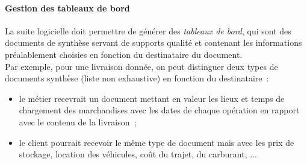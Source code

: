 \paragraph{Gestion des tableaux de bord}
La suite logicielle doit permettre de générer des \emph{tableaux de bord}, qui sont des documents de synthèse servant de supports qualité et contenant les informations préalablement choisies en fonction du destinataire du document.
\\
Par exemple, pour une livraison donnée, on peut distinguer deux types de documents synthèse (liste non exhaustive) en fonction du destinataire~:
\begin{itemize}
\item le métier recevrait un document mettant en valeur les lieux et temps de chargement des marchandises avec les dates de chaque opération en rapport avec le contenu de la livraison~;
\item le client pourrait recevoir le même type de document mais avec les prix de stockage, location des véhicules, coût du trajet, du carburant, ...
\end{itemize}

